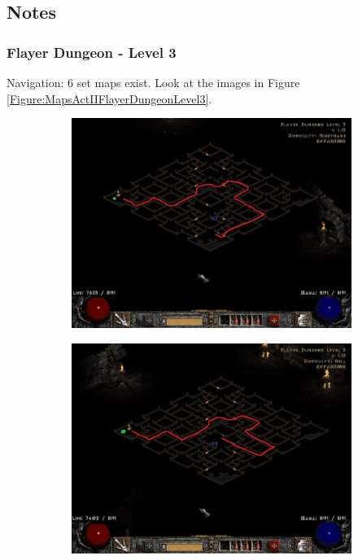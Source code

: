 \clearpage
\subsection{Notes}

\subsubsection{\internallinkicon Flayer Dungeon - Level 3}\label{MapsActIIIFlayerDungeonLevel3}

Navigation: 6 set maps exist. Look at the images in Figure \ref{Figure:MapsActIIFlayerDungeonLevel3}.


\begin{figure}[H]
	\centering
	\begin{subfigure}{0.495\hsize}
		\centering
		\includegraphics[width=\hsize]{Assets/FlayerDungeon3_1}
	\end{subfigure}
	\hfill
	\begin{subfigure}{0.495\hsize}
		\centering
		\includegraphics[width=\hsize]{Assets/FlayerDungeon3_2}
	\end{subfigure}


\end{figure}
